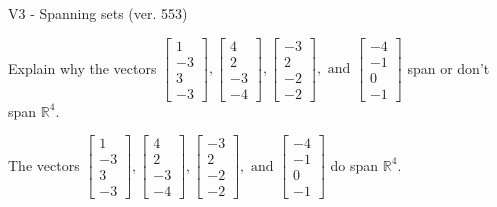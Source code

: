 \begin{exercise}
  \begin{exerciseTitle}V3 - Spanning sets (ver. 553)\end{exerciseTitle}
  \begin{exerciseStatement}
    Explain why the vectors \(\left[\begin{array}{r}
1 \\
-3 \\
3 \\
-3
\end{array}\right] , \left[\begin{array}{r}
4 \\
2 \\
-3 \\
-4
\end{array}\right] , \left[\begin{array}{r}
-3 \\
2 \\
-2 \\
-2
\end{array}\right] , \text{ and } \left[\begin{array}{r}
-4 \\
-1 \\
0 \\
-1
\end{array}\right]\) span or don't span \(\mathbb{R}^4\). 
	


  \end{exerciseStatement}
  \begin{exerciseAnswer}
   The vectors \(\left[\begin{array}{r}
1 \\
-3 \\
3 \\
-3
\end{array}\right] , \left[\begin{array}{r}
4 \\
2 \\
-3 \\
-4
\end{array}\right] , \left[\begin{array}{r}
-3 \\
2 \\
-2 \\
-2
\end{array}\right] , \text{ and } \left[\begin{array}{r}
-4 \\
-1 \\
0 \\
-1
\end{array}\right]\) 
  	 do  
	span \(\mathbb{R}^4\).
  


  \end{exerciseAnswer}
\end{exercise}
